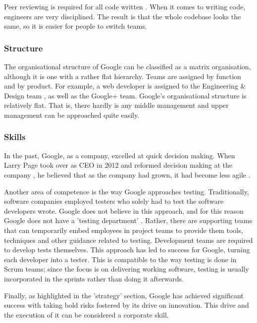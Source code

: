 Peer reviewing is required for all code written \citep{Steve4:online}. When it comes to writing code, engineers are very disciplined. The result is that the whole codebase looks the same, so it is easier for people to switch teams.

\subsubsection{Structure}
The organisational structure of Google can be classified as a matrix organisation, although it is one with a rather flat hierarchy.
Teams are assigned by function and by product.
For example, a web developer is assigned to the Engineering \& Design team \citep{Teams23:online}, as well as the Google+ team.
Google's organisational structure is relatively flat.
That is, there hardly is any middle management and upper management can be approached quite easily.

\subsubsection{Skills}
In the past, Google, as a company, excelled at quick decision making.
When Larry Page took over as CEO in 2012 and reformed decision making at the company \citep{Start62:online}, he believed that as the company had grown, it had become less agile \citep{Profe61:online}.

Another area of competence is the way Google approaches testing.
Traditionally, software companies employed testers who solely had to test the software developers wrote.
Google does not believe in this approach, and for this reason Google does not have a 'testing department' \citep{Googl3:online}.
Rather, there are supporting teams that can temporarily embed employees in project teams to provide them tools, techniques and other guidance related to testing.
Development teams are required to develop tests themselves.
This approach has led to success for Google, turning each developer into a tester.
This is compatible to the way testing is done in Scrum teams; since the focus is on delivering working software, testing is usually incorporated in the sprints rather than doing it afterwards.

Finally, as highlighted in the 'strategy' section, Google has achieved significant success with taking bold risks fostered by its drive on innovation.
This drive and the execution of it can be considered a corporate skill.

